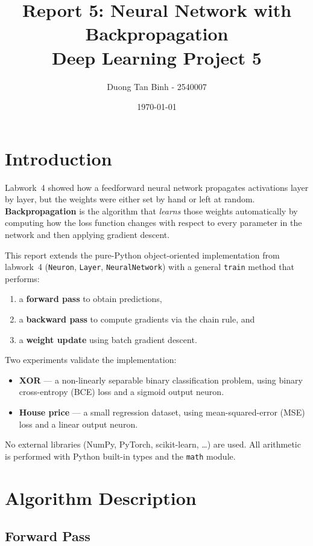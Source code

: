 \documentclass[12pt,a4paper]{article}
\title{\textbf{Report 5: Neural Network with Backpropagation} \\ \large Deep Learning Project 5}
\author{Duong Tan Binh - 2540007}
\date{\today}
\begin{document}
\maketitle
\tableofcontents
\newpage

\section{Introduction}

Labwork~4 showed how a feedforward neural network propagates activations layer by layer,
but the weights were either set by hand or left at random.
\textbf{Backpropagation} is the algorithm that \emph{learns} those weights automatically
by computing how the loss function changes with respect to every parameter in the network
and then applying gradient descent.

This report extends the pure-Python object-oriented implementation from labwork~4
(\texttt{Neuron}, \texttt{Layer}, \texttt{NeuralNetwork}) with a general \texttt{train}
method that performs:
\begin{enumerate}
    \item a \textbf{forward pass} to obtain predictions,
    \item a \textbf{backward pass} to compute gradients via the chain rule, and
    \item a \textbf{weight update} using batch gradient descent.
\end{enumerate}

Two experiments validate the implementation:
\begin{itemize}
    \item \textbf{XOR} --- a non-linearly separable binary classification problem,
          using binary cross-entropy (BCE) loss and a sigmoid output neuron.
    \item \textbf{House price} --- a small regression dataset,
          using mean-squared-error (MSE) loss and a linear output neuron.
\end{itemize}

No external libraries (NumPy, PyTorch, scikit-learn, \ldots) are used.
All arithmetic is performed with Python built-in types and the \texttt{math} module.

\section{Algorithm Description}

\subsection{Forward Pass}
\end{document}
